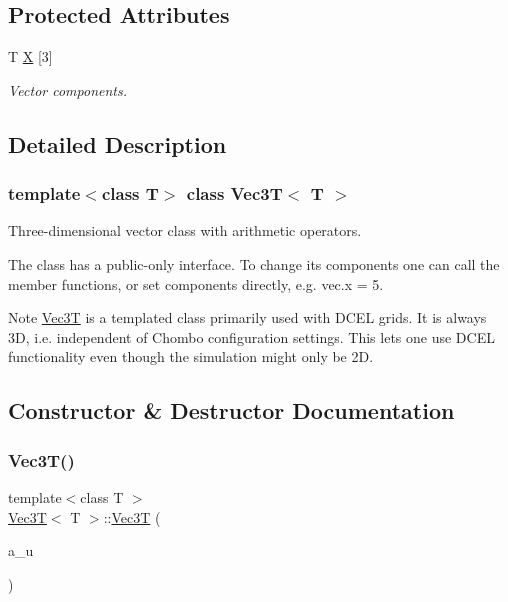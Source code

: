 \subsection*{Protected Attributes}
\begin{DoxyCompactItemize}
\item 
\mbox{\label{classVec3T_a0643a9f9a68edf5d4656f2e613c9624f}} 
T \hyperlink{classVec3T_a0643a9f9a68edf5d4656f2e613c9624f}{X} \mbox{[}3\mbox{]}
\begin{DoxyCompactList}\small\item\em Vector components. \end{DoxyCompactList}\end{DoxyCompactItemize}


\subsection{Detailed Description}
\subsubsection*{template$<$class T$>$\newline
class Vec3\+T$<$ T $>$}

Three-\/dimensional vector class with arithmetic operators. 

The class has a public-\/only interface. To change it\textquotesingle{}s components one can call the member functions, or set components directly, e.\+g. vec.\+x = 5. \begin{DoxyNote}{Note}
\hyperlink{classVec3T}{Vec3T} is a templated class primarily used with D\+C\+EL grids. It is always 3D, i.\+e. independent of Chombo configuration settings. This lets one use D\+C\+EL functionality even though the simulation might only be 2D. 
\end{DoxyNote}


\subsection{Constructor \& Destructor Documentation}
\mbox{\label{classVec3T_ab328767434f527b25c110dc83a0cb7ee}} 
\subsubsection{\texorpdfstring{Vec3\+T()}{Vec3T()}\hspace{0.1cm}{\footnotesize\ttfamily [1/2]}}
{\footnotesize\ttfamily template$<$class T $>$ \\
\hyperlink{classVec3T}{Vec3T}$<$ T $>$\+::\hyperlink{classVec3T}{Vec3T} (\begin{DoxyParamCaption}\item[{const \hyperlink{classVec3T}{Vec3T}$<$ T $>$ \&}]{a\+\_\+u }\end{DoxyParamCaption})\hspace{0.3cm}{\ttfamily [inline]}}



